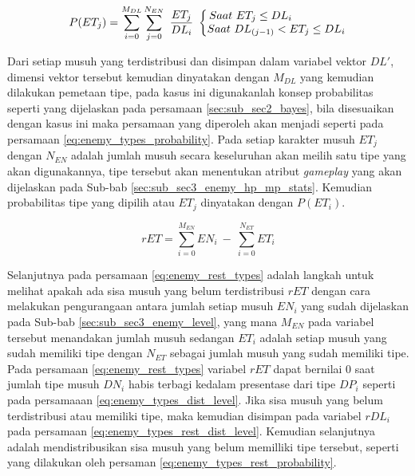 \begin{equation}\label{eq:enemy_types_probability}
P(ET_{j}) = \sum_{i = 0}^{M_{DL}} \sum_{j = 0}^{N_{EN}}\ \frac{ET_{j}}{DL_{i}}\
\left\{\begin{matrix}
\hspace{-4.6em} Saat\ ET_{j} \leq DL_{i} \\ 
Saat\ DL_{(j-1)} < ET_{j} \leq DL_{i}
\end{matrix}\right.
\end{equation}

Dari setiap musuh yang terdistribusi dan disimpan dalam variabel vektor $DL'$, dimensi vektor tersebut kemudian dinyatakan dengan $M_{DL}$ yang kemudian dilakukan pemetaan tipe, pada kasus ini digunakanlah konsep probabilitas seperti yang dijelaskan pada persamaan \ref{sec:sub_sec2_bayes}, bila disesuaikan dengan kasus ini maka persamaan yang diperoleh akan menjadi seperti pada persamaan \ref{eq:enemy_types_probability}. Pada setiap karakter musuh $ET_{j}$ dengan $N_{EN}$ adalah jumlah musuh secara keseluruhan akan meilih satu tipe yang akan digunakannya, tipe tersebut akan menentukan atribut \textit{gameplay} yang akan dijelaskan pada Sub-bab \ref{sec:sub_sec3_enemy_hp_mp_stats}. Kemudian probabilitas tipe yang dipilih atau $ET_{j}$ dinyatakan dengan $P(ET_{i})$.
\vspace{1ex}

\begin{equation}\label{eq:enemy_rest_types}
rET = \sum_{i = 0}^{M_{EN}} EN_{i}\ -\ \sum_{i = 0}^{N_{ET}} ET_{i}
\end{equation}

Selanjutnya pada persamaan \ref{eq:enemy_rest_types} adalah langkah untuk melihat apakah ada sisa musuh yang belum terdistribusi $rET$ dengan cara melakukan pengurangaan antara jumlah setiap musuh $EN_{i}$ yang sudah dijelaskan pada Sub-bab \ref{sec:sub_sec3_enemy_level}, yang mana $M_{EN}$ pada variabel tersebut menandakan jumlah musuh sedangan $ET_{i}$ adalah setiap musuh yang sudah memiliki tipe dengan $N_{ET}$ sebagai jumlah musuh yang sudah memiliki tipe. Pada persamaan \ref{eq:enemy_rest_types} variabel $rET$ dapat bernilai 0 saat jumlah tipe musuh $DN_{i}$ habis terbagi kedalam presentase dari tipe $DP_{i}$ seperti pada persamaaan \ref{eq:enemy_types_dist_level}. Jika sisa musuh yang belum terdistribusi atau memiliki tipe, maka kemudian disimpan pada variabel $rDL_{i}$ pada persamaan \ref{eq:enemy_types_rest_dist_level}. Kemudian selanjutnya adalah mendistribusikan sisa musuh yang belum memilliki tipe tersebut, seperti yang dilakukan oleh persaman \ref{eq:enemy_types_rest_probability}.
\vspace{1ex}

